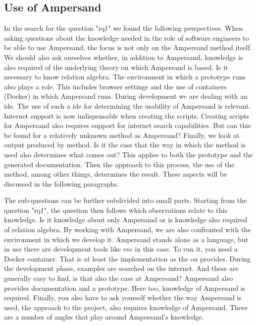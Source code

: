 \subsection{Use of Ampersand}\label{use_of_ampersand}
In the search for the question "\acrlong{rq1}" we found the following perspectives.
When asking questions about the knowledge needed in the role of software engineers to be able to use Ampersand, the focus is not only on the Ampersand method itself.
We should also ask ourselves whether, in addition to Ampersand, knowledge is also required of the underlying theory on which Ampersand is based.
Is it necessary to know relation algebra.
The environment in which a prototype runs also plays a role.
This includes browser settings and the use of containers (Docker) in which Ampersand runs.
During development we are dealing with an \acrfull{ide}.
The use of such a \acrshort{ide} for determining the usability of Ampersand is relevant.
Internet support is now indispensable when creating the scripts.
Creating scripts for Ampersand also requires support for internet search capabilities.
But can this be found for a relatively unknown method as Ampersand?
Finally, we look at output produced by method.
Is it the case that the way in which the method is used also determines what comes out?
This applies to both the prototype and the generated documentation.
Then the approach to this process, the use of the method, among other things, determines the result.
These aspects will be discussed in the following paragraphs.

The sub-questions can be further subdivided into small parts.
Starting from the question "\acrlong{rq1}", the question then follows which observations relate to this knowledge.
Is it knowledge about only Ampersand or is knowledge also required of relation algebra.
By working with Ampersand, we are also confronted with the environment in which we develop it.
Ampersand stands alone as a language, but in use there are development tools like \acrlong{vsc} in this case.
To run it, you need a Docker container.
That is at least the implementation as the \acrlong{ou} provides.
During the development phase, examples are searched on the internet.
And these are generally easy to find, is that also the case at Ampersand?
Ampersand also provides documentation and a prototype.
Here too, knowledge of Ampersand is required.
Finally, you also have to ask yourself whether the way Ampersand is used, the approach to the project, also requires knowledge of Ampersand.
There are a number of angles that play around Ampersand's knowledge.

